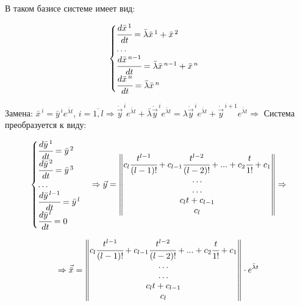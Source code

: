 В таком базисе системе имеет вид:

\begin{equation}
 \begin{cases}
   \cfrac{d \bar{x}^{\,1}}{dt} = \bar{\lambda} \bar{x}^{\,1} + \bar{x}^{\,2} \\
   \ldots \\
   \cfrac{d \bar{x}^{\,n-1}}{dt} = \bar{\lambda} \bar{x}^{\,n-1} + \bar{x}^{\,n} \\
   \cfrac{d \bar{x}^{\,n}}{dt} = \bar{\lambda} \bar{x}^{\,n} \\
 \end{cases} 
\end{equation}

Замена: $\bar{x}^{\,i} = \bar{y}^{\,i} e^{\bar{\lambda} t}$, $i = \overline{1, l} \Rightarrow \dot{\vec{y}}^{\,i} e^{\bar{\lambda} t} + \bar{\lambda} \dot{\vec{y}}^{\,i} e^{\bar{\lambda} t} = \lambda \dot{\vec{y}}^{\,i} e^{\bar{\lambda} t} + \dot{\vec{y}}^{\,i+1} e^{\bar{\lambda} t} \Rightarrow$
Система преобразуется к виду:

\begin{equation}
  \begin{cases}
    \cfrac{d\bar{y}^{\,1}}{dt} = \bar{y}^{\,2} \\ 
    \cfrac{d\bar{y}^{\,2}}{dt} = \bar{y}^{\,3} \\
    \ldots \\
    \cfrac{d\bar{y}^{\,l-1}}{dt} = \bar{y}^{\,l} \\
    \cfrac{d\bar{y}^{\,l}}{dt} = 0
  \end{cases}
  \Rightarrow 
  \vec{y} = \begin{Vmatrix*} c_l \cfrac{t^{l-1}}{(l-1)!} + c_{l-1} \cfrac{t^{l-2}}{(l-2)!} + ... + c_2 \cfrac{t}{1!} + c_1 \\
                            \ldots \\
                            \ldots \\
                            c_l t + c_{l-1} \\
                            c_l \end{Vmatrix*} \Rightarrow  
\end{equation}

\begin{equation*}
  \Rightarrow \vec{\bar{x}} = \begin{Vmatrix*} c_l \cfrac{t^{l-1}}{(l-1)!} + c_{l-1} \cfrac{t^{l-2}}{(l-2)!} + ... + c_2 \cfrac{t}{1!} + c_1 \\
    \ldots \\
    \ldots \\
    c_l t + c_{l-1} \\
    c_l \end{Vmatrix*} \cdot e^{\bar{\lambda} t} 
\end{equation*}


